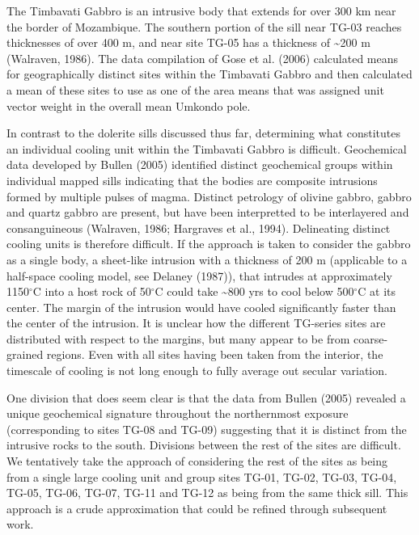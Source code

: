 \documentclass{article}
\begin{document}
    The Timbavati Gabbro is an intrusive body that extends for over 300 km
near the border of Mozambique. The southern portion of the sill near
TG-03 reaches thicknesses of over 400 m, and near site TG-05 has a
thickness of \textasciitilde{}200 m (Walraven, 1986). The data
compilation of Gose et al. (2006) calculated means for geographically
distinct sites within the Timbavati Gabbro and then calculated a mean of
these sites to use as one of the area means that was assigned unit
vector weight in the overall mean Umkondo pole.

In contrast to the dolerite sills discussed thus far, determining what
constitutes an individual cooling unit within the Timbavati Gabbro is
difficult. Geochemical data developed by Bullen (2005) identified
distinct geochemical groups within individual mapped sills indicating
that the bodies are composite intrusions formed by multiple pulses of
magma. Distinct petrology of olivine gabbro, gabbro and quartz gabbro
are present, but have been interpretted to be interlayered and
consanguineous (Walraven, 1986; Hargraves et al., 1994). Delineating
distinct cooling units is therefore difficult. If the approach is taken
to consider the gabbro as a single body, a sheet-like intrusion with a
thickness of 200 m (applicable to a half-space cooling model, see
Delaney (1987)), that intrudes at approximately 1150\(^\circ\)C into a
host rock of 50\(^\circ\)C could take \textasciitilde{}800 yrs to cool
below 500\(^\circ\)C at its center. The margin of the intrusion would
have cooled significantly faster than the center of the intrusion. It is
unclear how the different TG-series sites are distributed with respect
to the margins, but many appear to be from coarse-grained regions. Even
with all sites having been taken from the interior, the timescale of
cooling is not long enough to fully average out secular variation.

One division that does seem clear is that the data from Bullen (2005)
revealed a unique geochemical signature throughout the northernmost
exposure (corresponding to sites TG-08 and TG-09) suggesting that it is
distinct from the intrusive rocks to the south. Divisions between the
rest of the sites are difficult. We tentatively take the approach of
considering the rest of the sites as being from a single large cooling
unit and group sites TG-01, TG-02, TG-03, TG-04, TG-05, TG-06, TG-07,
TG-11 and TG-12 as being from the same thick sill. This approach is a
crude approximation that could be refined through subsequent work.
\end{document}
